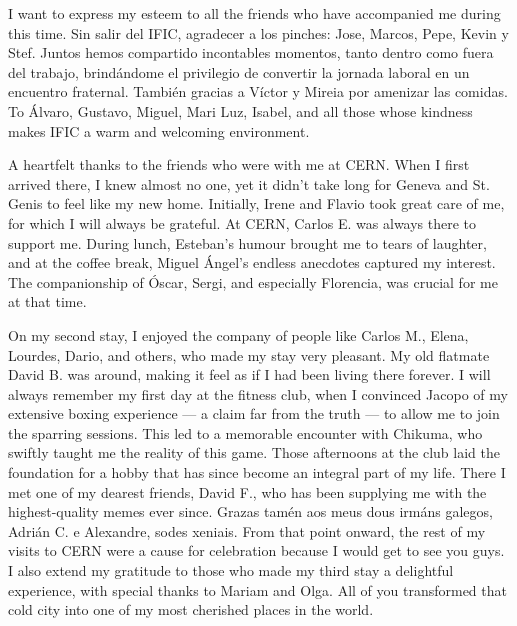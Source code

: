 %


I want to express my esteem to all the friends who have accompanied me during this time.
Sin salir del IFIC, agradecer a los pinches: Jose, Marcos, Pepe, Kevin y Stef. 
Juntos hemos compartido incontables momentos, tanto dentro como fuera del trabajo, 
brindándome el privilegio de convertir la jornada laboral en un encuentro fraternal.
También gracias a Víctor y Mireia por amenizar las comidas. 
To Álvaro, Gustavo, Miguel, Mari Luz, Isabel, and all those whose kindness makes IFIC a warm and welcoming environment.


A heartfelt thanks to the friends who were with me at CERN. When I first arrived there, I knew almost no one, yet it didn't take long for Geneva and St.\,Genis to feel like my new home. Initially, Irene and Flavio took great care of me, for which I will always be grateful. At CERN, Carlos E. was always there to support me. During lunch, Esteban's humour brought me to tears of laughter, and at the coffee break, Miguel Ángel's endless anecdotes captured my interest. The companionship of Óscar, Sergi, and especially Florencia, was crucial for me at that time. 
 
On my second stay, I enjoyed the company of people like Carlos M., Elena, Lourdes, Dario, and others, who made my stay very pleasant. My old flatmate David B. was around, making it feel as if I had been living there forever. I will always remember my first day at the fitness club, when I convinced Jacopo of my extensive boxing experience — a claim far from the truth — to allow me to join the sparring sessions. This led to a memorable encounter with Chikuma, who swiftly taught me the reality of this game.
Those afternoons at the club laid the foundation for a hobby that has since become an integral part of my life.
There I met one of my dearest friends, David F., who has been supplying me with the highest-quality memes ever since. 
Grazas tamén aos meus dous irmáns galegos, Adrián C. e Alexandre, sodes xeniais.
From that point onward, the rest of my visits to CERN were a cause for celebration because I would get to see you guys. 
I also extend my gratitude to those who made my third stay a delightful experience, with special thanks to Mariam and Olga. 
All of you transformed that cold city into one of my most cherished places in the world.
 
